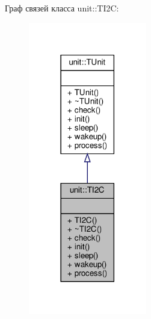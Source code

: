Граф связей класса unit\+:\+:T\+I2C\+:\nopagebreak
\begin{figure}[H]
\begin{center}
\leavevmode
\includegraphics[width=146pt]{classunit_1_1_t_i2_c__coll__graph}
\end{center}
\end{figure}
